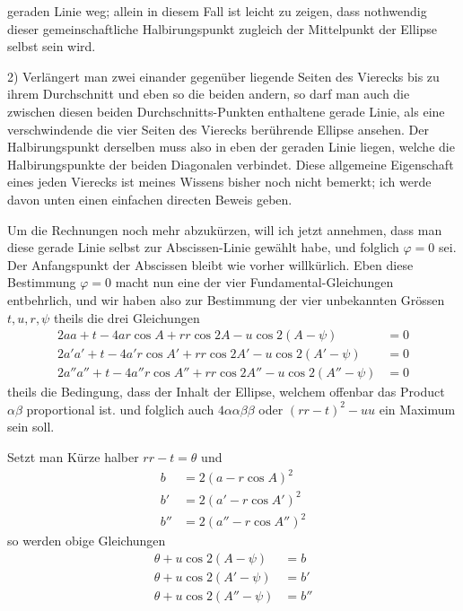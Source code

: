 %
geraden Linie weg; allein in diesem Fall ist leicht zu zeigen, dass nothwendig dieser gemeinschaftliche Halbirungspunkt zugleich der Mittelpunkt der Ellipse selbst sein wird.

2) Verlängert man zwei einander gegenüber liegende Seiten des Vierecks bis zu ihrem Durchschnitt und eben so die beiden andern, so darf man auch die zwischen diesen beiden Durchschnitts-Punkten enthaltene gerade Linie, als eine verschwindende die vier Seiten des Vierecks berührende Ellipse ansehen. Der Halbirungspunkt derselben muss also in eben der geraden Linie liegen, welche die Halbirungspunkte der beiden Diagonalen verbindet. Diese allgemeine Eigenschaft eines jeden Vierecks ist meines Wissens bisher noch nicht bemerkt; ich werde davon unten einen einfachen directen Beweis geben.

Um die Rechnungen noch mehr abzukürzen, will ich jetzt annehmen, dass man diese gerade Linie selbst zur Abscissen-Linie gewählt habe, und folglich \(\varphi=0\) sei. Der Anfangspunkt der Abscissen bleibt wie vorher willkürlich. Eben diese Bestimmung \(\varphi=0\) macht nun eine der vier Fundamental-Gleichungen entbehrlich, und wir haben also zur Bestimmung der vier unbekannten Grössen \(t,u,r,\psi\) theils die drei Gleichungen
\[
\begin{aligned}
2aa+t-4ar\cos A+rr\cos2A-u\cos2(A-\psi)&=0\\
2a'a'+t-4a'r\cos A'+rr\cos2A'-u\cos2(A'-\psi)&=0\\
2a''a''+t-4a''r\cos A''+rr\cos2A''-u\cos2(A''-\psi)&=0
\end{aligned}
\]
theils die Bedingung, dass der Inhalt der Ellipse, welchem offenbar das Product \(\alpha\beta\) proportional ist. und folglich auch \(4\alpha\alpha\beta\beta\) oder \((rr-t)^2-uu\) ein Maximum sein soll.

Setzt man Kürze halber \(rr-t=\theta\) und
\[
\begin{aligned}
b&=2(a-r\cos A)^2\\
b'&=2(a'-r\cos A')^2\\
b''&=2(a''-r\cos A'')^2
\end{aligned}
\]
so werden obige Gleichungen
\[
\begin{aligned}
\theta+u\cos2(A-\psi)&=b\\
\theta+u\cos2(A'-\psi)&=b'\\
\theta+u\cos2(A''-\psi)&=b''
\end{aligned}
\]
